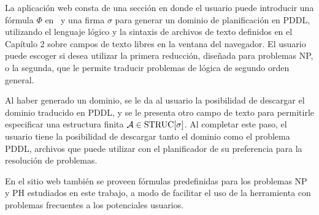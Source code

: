 La aplicación web consta de una sección en donde el usuario puede introducir
una fórmula $\Phi$ en \LSO\ y una firma $\sigma$ para generar un dominio de
planificación en PDDL, utilizando el lenguaje lógico y la
sintaxis de archivos de texto definidos en el Capítulo 2 sobre campos de texto
libres en la ventana del navegador.
El usuario puede escoger si desea utilizar la primera reducción, diseñada para
problemas NP, o la segunda, que le permite traducir problemas de lógica de
segundo orden general.

Al haber generado un dominio, se le da al usuario la posibilidad de descargar
el dominio traducido en PDDL, y se le presenta otro campo de texto para
permitirle especificar una estructura finita $\mathcal{A} \in \text{STRUC}[\sigma]$.
Al completar este paso, el usuario tiene la posibilidad de descargar tanto el
dominio como el problema PDDL, archivos que puede utilizar con el planificador
de su preferencia para la resolución de problemas.

En el sitio web también se proveen fórmulas predefinidas para los problemas NP
y PH estudiados en este trabajo, a modo de facilitar el uso de la herramienta
con problemas frecuentes a los potenciales usuarios.
